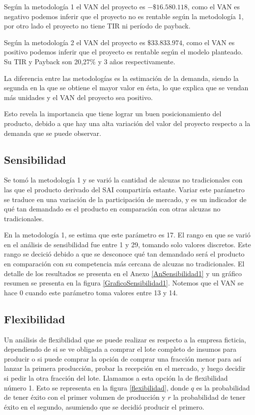 Según la metodología 1 el VAN del proyecto es $-\$16.580.118$, como el VAN es negativo podemos inferir que el proyecto no es rentable según la metodología 1, por otro lado el proyecto no tiene TIR ni período de payback.

Según la metodología 2 el VAN del proyecto es $\$33.833.974$, como el VAN es positivo podemos inferir que el proyecto es rentable según el modelo planteado. Su TIR y Payback son 20,27\% y 3 años respectivamente.

La diferencia entre las metodologías es la estimación de la demanda, siendo la segunda en la que se obtiene el mayor valor en ésta, lo que explica que se vendan más unidades y el VAN del proyecto sea positivo.

Esto revela la importancia que tiene lograr un buen posicionamiento del producto, debido a que hay una alta variación del valor del proyecto respecto a la demanda que se puede observar.

\subsection{Sensibilidad}

Se tomó la metodología 1 y se varió la cantidad de alcuzas no tradicionales con las que el producto derivado del SAI compartiría estante. Variar este parámetro se traduce en una variación de la participación de mercado, y es un indicador de qué tan demandado es el producto en comparación con otras alcuzas no tradicionales.

En la metodología 1, se estima que este parámetro es 17. El rango en que se varió en el análisis de sensibilidad fue entre 1 y 29, tomando solo valores discretos. Este rango se decició debido a que se desconoce qué tan demandado será el producto en comparación con su competencia más cercana de alcuzas no tradicionales. El detalle de los resultados se presenta en el Anexo \ref{AnSensibilidad1} y un gráfico resumen se presenta en la figura \ref{GraficoSensibilidad1}. Notemos que el VAN se hace 0 cuando este parámetro toma valores entre 13 y 14.

\subsection{Flexibilidad}

Un análisis de flexibilidad que se puede realizar es respecto a la empresa ficticia, dependiendo de si se ve obligada a comprar el lote completo de insumos para producir o si puede comprar la opción de comprar una fracción menor para así lanzar la primera producción, probar la recepción en el mercado, y luego decidir si pedir la otra fracción del lote. Llamamos a esta opción la de flexibilidad número 1. Esto se representa en la figura \ref{flexibilidad}, donde $q$ es la probabilidad de tener éxito con el primer volumen de producción y $r$ la probabilidad de tener éxito en el segundo, asumiendo que se decidió producir el primero.

